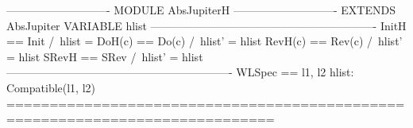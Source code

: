 \documentclass[preview, border={5pt 0pt 5pt 1pt}]{standalone}
\begin{document}
\begin{tla}
---------------------------- MODULE AbsJupiterH ----------------------------
EXTENDS AbsJupiter 
VARIABLE hlist
-------------------------------------------------------------
InitH == Init /\ hlist = {}
DoH(c) == Do(c) /\ hlist' = hlist 
RevH(c) == Rev(c) /\ hlist' = hlist 
SRevH == SRev /\ hlist' = hlist 
-------------------------------------------------------------
WLSpec == \A l1, l2 \in hlist: Compatible(l1, l2)
=============================================================================
\end{tla}
\begin{tlatex}
\@x{}\moduleLeftDash{}\moduleRightDash\@xx{}%
%
%
\@x{}\midbar\@xx{}%
%
\@x{}\midbar\@xx{}%
\@x{}\bottombar\@xx{}%
\end{tlatex}
\end{document}
